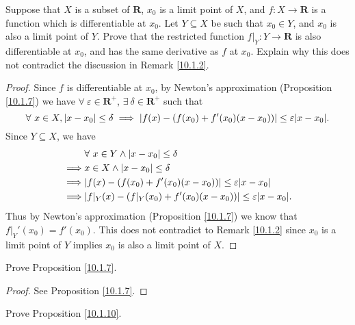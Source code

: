 \exercisesection

\begin{exercise}\label{ex 10.1.1}
    Suppose that \(X\) is a subset of \(\mathbf{R}\), \(x_0\) is a limit point of \(X\), and \(f : X \to \mathbf{R}\) is a function which is differentiable at \(x_0\).
    Let \(Y \subseteq X\) be such that \(x_0 \in Y\), and \(x_0\) is also a limit point of \(Y\).
    Prove that the restricted function \(f|_Y : Y \to \mathbf{R}\) is also differentiable at \(x_0\), and has the same derivative as \(f\) at \(x_0\).
    Explain why this does not contradict the discussion in Remark \ref{10.1.2}.
\end{exercise}

\begin{proof}
    Since \(f\) is differentiable at \(x_0\), by Newton's approximation (Proposition \ref{10.1.7}) we have \(\forall\ \varepsilon \in \mathbf{R}^+\), \(\exists\ \delta \in \mathbf{R}^+\) such that
    \[
        \forall\ x \in X, \abs*{x - x_0} \leq \delta \implies \abs*{f(x) - (f(x_0) + f'(x_0)(x - x_0))} \leq \varepsilon \abs*{x - x_0}.
    \]
    Since \(Y \subseteq X\), we have
    \begin{align*}
                 & \forall\ x \in Y \land \abs*{x - x_0} \leq \delta                                \\
        \implies & x \in X \land \abs*{x - x_0} \leq \delta                                         \\
        \implies & \abs*{f(x) - (f(x_0) + f'(x_0)(x - x_0))} \leq \varepsilon \abs*{x - x_0}        \\
        \implies & \abs*{f|_Y(x) - (f|_Y(x_0) + f'(x_0)(x - x_0))} \leq \varepsilon \abs*{x - x_0}.
    \end{align*}
    Thus by Newton's approximation (Proposition \ref{10.1.7}) we know that \(f|_Y'(x_0) = f'(x_0)\).
    This does not contradict to Remark \ref{10.1.2} since \(x_0\) is a limit point of \(Y\) implies \(x_0\) is also a limit point of \(X\).
\end{proof}

\begin{exercise}\label{ex 10.1.2}
    Prove Proposition \ref{10.1.7}.
\end{exercise}

\begin{proof}
    See Proposition \ref{10.1.7}.
\end{proof}

\begin{exercise}\label{ex 10.1.3}
    Prove Proposition \ref{10.1.10}.
\end{exercise}

